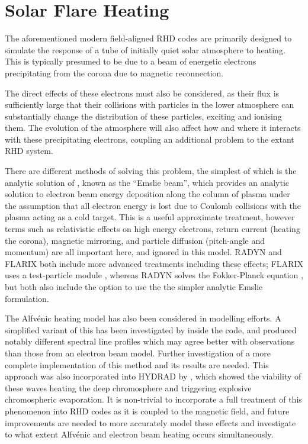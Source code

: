 \section{Solar Flare Heating}

The aforementioned modern field-aligned RHD codes are primarily designed to simulate the response of a tube of initially quiet solar atmosphere to heating.
This is typically presumed to be due to a beam of energetic electrons precipitating from the corona due to magnetic reconnection.

The direct effects of these electrons must also be considered, as their flux is sufficiently large that their collisions with particles in the lower atmosphere can substantially change the distribution of these particles, exciting and ionising them.
The evolution of the atmosphere will also affect how and where it interacts with these precipitating electrons, coupling an additional problem to the extant RHD system.

There are different methods of solving this problem, the simplest of which is the analytic solution of \citet{Emslie1978}, known as the ``Emslie beam'', which provides an analytic solution to electron beam energy deposition along the column of plasma under the assumption that all electron energy is lost due to Coulomb collisions with the plasma acting as a cold target.
This is a useful approximate treatment, however terms such as relativistic effects on high energy electrons, return current (heating the corona), magnetic mirroring, and particle diffusion (pitch-angle and momentum) are all important here, and ignored in this model. RADYN and FLARIX both include more advanced treatments including these effects; FLARIX uses a test-particle module \citep{Varady2010}, whereas RADYN solves the Fokker-Planck equation \citep[now using the method of ][]{Allred2020}, but both also include the option to use the the simpler analytic Emslie formulation.

The Alfvénic heating model has also been considered in modelling efforts.
A simplified variant of this has been investigated by \citet{Kerr2016} inside the \Radyn{} code, and produced notably different spectral line profiles which may agree better with observations than those from an electron beam model.
Further investigation of a more complete implementation of this method and its results are needed.
This approach was also incorporated into HYDRAD by \citet{Reep2016}, which showed the viability of these waves heating the deep chromosphere and triggering explosive chromospheric evaporation.
It is non-trivial to incorporate a full treatment of this phenomenon into RHD codes as it is coupled to the magnetic field, and future improvements are needed to more accurately model these effects and investigate to what extent Alfvénic and electron beam heating occurs simultaneously.

